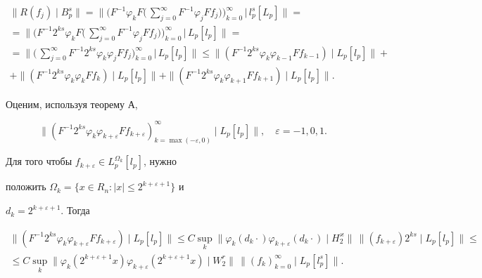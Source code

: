 \begin{multline*} 


\|R(f_j)\mid B^s_p\|=\Big\|\Big(F^{-1}\varphi_k F\Big(\, 


\sum^\infty_{j=0}F^{-1}\varphi_j Ff_j\Big)\Big)^\infty_{k=0} 


\,\Big|\,l^s_p[L_p]\Big\|= \\


%


=\Big\|\Big(F^{-1}2^{ks}\varphi_k F 


\Big(\,\sum^\infty_{j=0}F^{-1}\varphi_j Ff_j\Big) 


\Big)^\infty_{k=0}\,\Big|\,L_p[l_p]\Big\|= \\ 


% 


=\Big\|\Big(\,\sum^\infty_{j=0}F^{-1}2^{ks} 


\varphi_k\varphi_j Ff_j\Big)^\infty_{k=0}\,\Big|\, 


L_p[l_p]\Big\|\le \|(F^{-1}2^{ks}\varphi_k\varphi_{k-1} 


Ff_{k-1})\mid L_p[l_p]\|+ \\ 


% 


+\|(F^{-1}2^{ks}\varphi_k\varphi_k Ff_k)\mid 


L_p[l_p]\|+\|(F^{-1}2^{ks}\varphi_k\varphi_{k+1}Ff_{k+1} 


)\mid L_p[l_p]\|. 


\end{multline*} 


Оценим, используя теорему А, 


$$ 


\|(F^{-1}2^{ks}\varphi_k\varphi_{k+\varepsilon} 


Ff_{k+\varepsilon})^\infty_{k=\max(-\varepsilon,0)}\mid 


L_p[l_p]\|,\quad \varepsilon=-1,0,1. 


$$ 


Для того чтобы $f_{k+\varepsilon}\in L^{\Omega_k}_p[l_p]$, нужно 


положить $\Omega_k=\{x\in R_n:|x|\le 2^{k+\varepsilon+1}\}$ и 


$d_k=2^{k+\varepsilon+1}$. Тогда 


\begin{multline*} 


\|(F^{-1}2^{ks}\varphi_k\varphi_{k+\varepsilon} 


Ff_{k+\varepsilon})\mid L_p[l_p]\|\le 




C\sup_k\|\varphi_k(d_k\cdot)\varphi_{k+\varepsilon} 


(d_k\cdot)\mid H^\varkappa_2\|\,\|(f_{k+\varepsilon})2^{ks}\mid 


L_p[l_p]\|\le \\ 


\le C\sup_k\|\varphi_k(2^{k+\varepsilon+1}x)\varphi_{k+\varepsilon} 


(2^{k+\varepsilon+1}x)\mid W^r_2\|\,\|(f_k)^\infty_{k=0} 


\mid L_p[l^s_p]\|. 


\end{multline*} 


